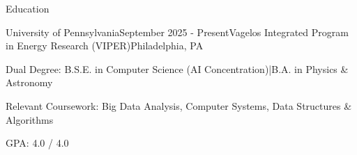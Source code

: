 \documentclass[
	10pt, %
]{resume} %
\begin{document}

\begin{rSection}{Education}

	\begin{rSubsection}{University of Pennsylvania}{September 2025 - Present}{Vagelos Integrated Program in Energy Research (VIPER)}{Philadelphia, PA}
		\item Dual Degree: B.S.E. in Computer Science (AI Concentration)\;|\;B.A. in Physics \& Astronomy
		\item Relevant Coursework: Big Data Analysis, Computer Systems, Data Structures \& Algorithms
		\item GPA: 4.0 / 4.0
	\end{rSubsection}

\end{rSection}

\end{document}
